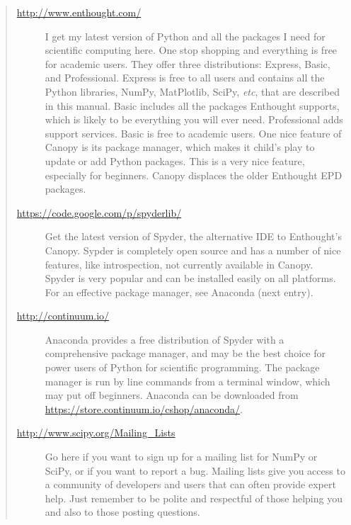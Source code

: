 \documentclass[letterpaper,10pt,english]{sphinxmanual}
\begin{document}
\begin{quote}
\begin{description}
\end{description}

\begin{description}
\item[{\href{http://www.enthought.com/}{http://www.enthought.com/}}] \leavevmode
I get my latest version of Python and all the packages I need for scientific computing here.  One stop shopping and everything is free for academic users.  They offer three distributions: Express, Basic, and Professional.  Express is free to all users and contains all the Python libraries, NumPy, MatPlotlib, SciPy, \emph{etc}, that are described in this manual.  Basic includes all the packages Enthought supports, which is likely to be everything you will ever need.  Professional adds support services.  Basic is free to academic users.  One nice feature of Canopy is its package manager, which makes it child's play to update or add Python packages.  This is a very nice feature, especially for beginners.  Canopy displaces the older Enthought EPD packages.

\end{description}

\begin{description}
\item[{\href{https://code.google.com/p/spyderlib/}{https://code.google.com/p/spyderlib/}}] \leavevmode
Get the latest version of Spyder, the alternative IDE to Enthought's Canopy.  Sypder is completely open source and has a number of nice features, like introspection, not currently available in Canopy.  Spyder is very popular and can be installed easily on all platforms.  For an effective package manager, see Anaconda (next entry).

\end{description}

\begin{description}
\item[{\href{http://continuum.io/}{http://continuum.io/}}] \leavevmode
Anaconda provides a free distribution of Spyder with a comprehensive package manager, and may be the best choice for power users of Python for scientific programming.  The package manager is run by line commands from a terminal window, which may put off beginners.  Anaconda can be downloaded from \href{https://store.continuum.io/cshop/anaconda/}{https://store.continuum.io/cshop/anaconda/}.

\item[{\href{http://www.scipy.org/Mailing\_Lists}{http://www.scipy.org/Mailing\_Lists}}] \leavevmode
Go here if you want to sign up for a mailing list for NumPy or SciPy, or if you want to report a bug.  Mailing lists give you access to a community of developers and users that can often provide expert help.  Just remember to be polite and respectful of those helping you and also to those posting questions.


\end{description}
\end{quote}
\end{document}
